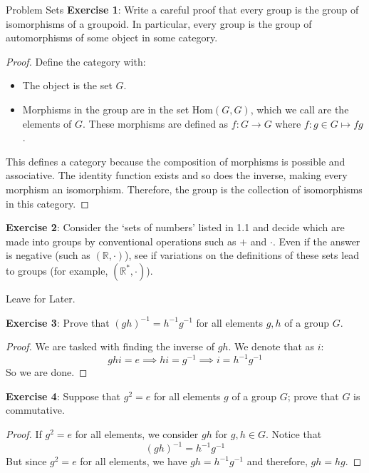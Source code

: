 \documentclass{report}
\begin{document}
\begin{exercises}{Problem Sets}
    \textbf{Exercise 1}: Write a careful proof that every group is the group of isomorphisms of a groupoid. In particular, every group is the group of automorphisms of some object in some category.
        \begin{proof}
            Define the category with:
                \begin{itemize}
                    \item The object is the set $G$.

                    \item Morphisms in the group are in the set $\text{Hom}(G, G)$, which we call are the elements of $G$. These morphisms are defined as $f : G \rightarrow G$ where $f : g \in G \mapsto fg$.
                \end{itemize}
            This defines a category because the composition of morphisms is possible and associative. The identity function exists and so does the inverse, making every morphism an isomorphism. Therefore, the group is the collection of isomorphisms in this category.
        \end{proof}

    \textbf{Exercise 2}: Consider the `sets of numbers' listed in 1.1 and decide which are made into groups by conventional operations such as $+$ and $\cdot$. Even if the answer is negative (such as $(\mathbb{R}, \cdot)$), see if variations on the definitions of these sets lead to groups (for example, $(\mathbb{R}^{*}, \cdot)$).
        \begin{answer}
            Leave for Later.
        \end{answer}

    \textbf{Exercise 3}: Prove that $(gh)^{-1} = h^{-1}g^{-1}$ for all elements $g, h$ of a group $G$.
        \begin{proof}
            We are tasked with finding the inverse of $gh$. We denote that as $i$:
                \begin{equation*}
                    ghi = e \implies hi = g^{-1} \implies i = h^{-1}g^{-1}
                \end{equation*}
            So we are done.
        \end{proof}

    \textbf{Exercise 4}: Suppose that $g^{2} = e$ for all elements $g$ of a group $G$; prove that $G$ is commutative.
        \begin{proof}
            If $g^{2} = e$ for all elements, we consider $gh$ for $g, h \in G$. Notice that 
                \begin{equation*}
                    (gh)^{-1} = h^{-1}g^{-1}
                \end{equation*}
            But since $g^{2} = e$ for all elements, we have $gh = h^{-1}g^{-1}$ and therefore, $gh = hg$.
        \end{proof}
 

\end{exercises}
\end{document}
